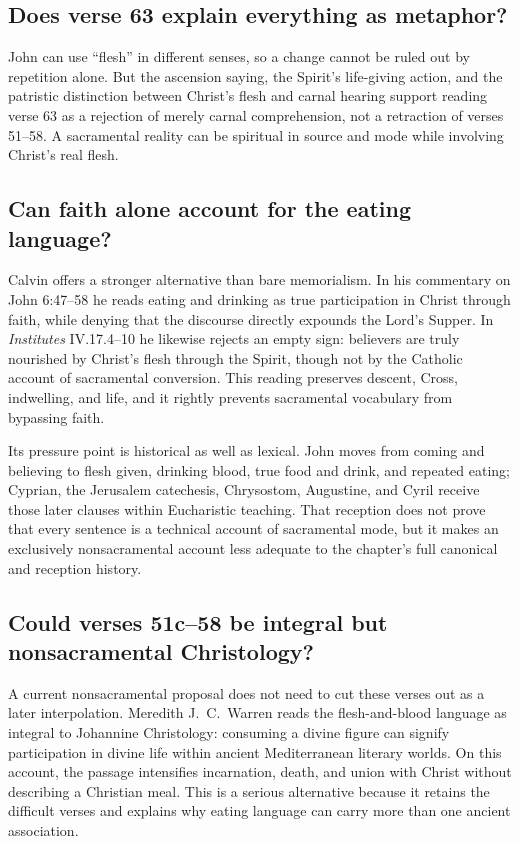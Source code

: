 \subsection{Does verse 63 explain everything as metaphor?}

John can use ``flesh'' in different senses, so a change cannot be ruled out by
repetition alone. But the ascension saying, the Spirit's life-giving action,
and the patristic distinction between Christ's flesh and carnal hearing support
reading verse 63 as a rejection of merely carnal comprehension, not a
retraction of verses 51--58. A sacramental reality can be spiritual in source
and mode while involving Christ's real flesh.

\subsection{Can faith alone account for the eating language?}

Calvin offers a stronger alternative than bare memorialism. In his commentary
on John 6:47--58 he reads eating and drinking as true participation in Christ
through faith, while denying that the discourse directly expounds the Lord's
Supper. In \emph{Institutes} IV.17.4--10 he likewise rejects an empty sign:
believers are truly nourished by Christ's flesh through the Spirit, though not
by the Catholic account of sacramental conversion. This reading preserves
descent, Cross, indwelling, and life, and it rightly prevents sacramental
vocabulary from bypassing faith.

Its pressure point is historical as well as lexical. John moves from coming and
believing to flesh given, drinking blood, true food and drink, and repeated
eating; Cyprian, the Jerusalem catechesis, Chrysostom, Augustine, and Cyril
receive those later clauses within Eucharistic teaching. That reception does
not prove that every sentence is a technical account of sacramental mode, but
it makes an exclusively nonsacramental account less adequate to the chapter's
full canonical and reception history.

\subsection{Could verses 51c--58 be integral but nonsacramental Christology?}

A current nonsacramental proposal does not need to cut these verses out as a
later interpolation. Meredith J.\ C.\ Warren reads the flesh-and-blood language
as integral to Johannine Christology: consuming a divine figure can signify
participation in divine life within ancient Mediterranean literary worlds.
On this account, the passage intensifies incarnation, death, and union with
Christ without describing a Christian meal. This is a serious alternative
because it retains the difficult verses and explains why eating language can
carry more than one ancient association.

